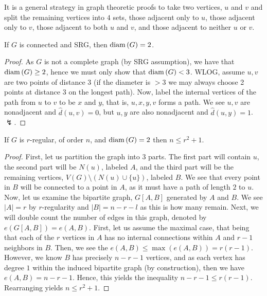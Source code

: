 \begin{remark} It is a general strategy in graph theoretic proofs to take two vertices, $u$ and $v$ and split the remaining vertices into $4$ sets, those adjacent only to $u$, those adjacent only to $v$, those adjacent to both $u$ and $v$, and those adjacent to neither $u$ or $v$.
\end{remark}
\begin{proposition}
	If $G$ is connected and SRG, then $\operatorname{diam} \left( G \right) = 2$.
\end{proposition}
\begin{proof}
	As $G$ is not a complete graph (by SRG assumption), we have that $\operatorname{diam} \left( G \right)  \ge 2$, hence we must only show that $\operatorname{diam} \left( G \right) < 3$. WLOG, assume $u, v$ are two points of distance $3$ (if the diameter is  $>3$ we may always choose 2 points at distance $3$ on the longest path). Now, label the internal vertices of the path from $u$ to $v$ to be $x$ and $y$, that is, $u, x, y, v$ forms a path. We see $u, v$ are nonadjacent and $\hat{d} \left( u, v \right) = 0$, but  $u, y$ are also nonadjacent and $\hat{d} \left( u, y \right) = 1$. $ \lightning$.
\end{proof}
\begin{propostion}
	If $G$ is $r$-regular, of order $n$, and $\operatorname{diam} \left( G \right) = 2$ then $n \le r^2 + 1$.
\end{propostion}
\begin{proof}
	First, let us partition the graph into $3$ parts. The first part will contain $u$, the second part will be $N\left( u \right) $, labeled $A$, and the third part will be the remaining vertices, $V\left( G \right) \setminus \left( N\left( u \right) \cup \{u\}  \right) $, labeled $B$. We see that every point in $B$ will be connected to a point in $A$, as it must have a path of length $2$ to $u$.  Now, let us examine the bipartite graph, $G\left[ A, B \right] $ generated by $A$ and $B$. We see $\left| A \right| = r$ by $r$-regularity and $\left| B \right| = n - r - l$ as this is how many remain. Next, we will double count the number of edges in this graph, denoted by $e\left( G\left[ A, B \right]  \right) = e\left( A, B \right) $. First, let us assume the maximal case, that being that each of the $r$ vertices in $A$ has no internal connections within $A$ and $r-1$ neighbors in $B$. Then, we see the $e\left( A, B \right) \le \max \left( e\left( A, B \right)  \right) = r\left( r-1 \right) $. However, we know $B$ has precisely $n-r-1$ vertices, and as each vertex has degree $1$ within the induced bipartite graph (by construction), then we have $e\left( A, B \right) = n - r - 1$. Hence, this yields the inequality $n - r - 1 \le r \left( r-1 \right) $. Rearranging yields $n \le r^2 + 1$.
\end{proof}

